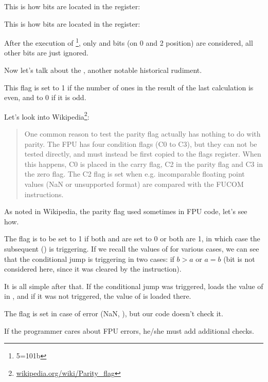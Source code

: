 This is how \CThreeBits bits are located in the \AX register:



This is how \CThreeBits bits are located in the \AH register:



After the execution of \footnote{5=101b}, 
only \Czero and \Ctwo bits (on 0 and 2 position) are considered, all other bits are just
ignored.

\label{parity_flag}

Now let's talk about the , another notable historical rudiment.

This flag is set to 1 if the number of ones in the result of the last calculation is even, and to 0 if it is odd.

Let's look into Wikipedia\footnote{\href{http://go.yurichev.com/17131}{wikipedia.org/wiki/Parity\_flag}}:

\begin{framed}
\begin{quotation}
One common reason to test the parity flag actually has nothing to do with parity. The FPU has four condition flags 
(C0 to C3), but they can not be tested directly, and must instead be first copied to the flags register. 
When this happens, C0 is placed in the carry flag, C2 in the parity flag and C3 in the zero flag. 
The C2 flag is set when e.g. incomparable floating point values (NaN or unsupported format) are compared 
with the FUCOM instructions.
\end{quotation}
\end{framed}

As noted in Wikipedia, the parity flag used sometimes in FPU code, let's see how.


The \PF flag is to be set to 1 if both \Czero and \Ctwo are set to 0 or both are 1, in which case
the subsequent \JP () is triggering. 
If we recall the values of \CThreeBits for various cases,
we can see that the conditional jump 
\JP is triggering in two cases: if $b>a$ or $a=b$ 
(\Cthree bit is not considered here, since it was cleared by 
the  instruction).

It is all simple after that. 
If the conditional jump was triggered, 
\FLD loads the value of  
in , and if it was not triggered, the value of  is loaded there.


The \Ctwo flag is set in case of error (\gls{NaN}, \etc{}), but our code doesn't check it.

If the programmer cares about FPU errors, he/she must add additional checks.


